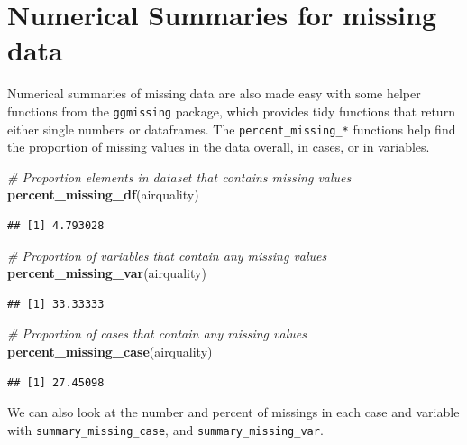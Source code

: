 \documentclass[]{article}
\newenvironment{Shaded}{\begin{snugshade}}{\end{snugshade}}
\newcommand{\KeywordTok}[1]{\textcolor[rgb]{0.13,0.29,0.53}{\textbf{{#1}}}}
\newcommand{\DecValTok}[1]{\textcolor[rgb]{0.00,0.00,0.81}{{#1}}}
\newcommand{\StringTok}[1]{\textcolor[rgb]{0.31,0.60,0.02}{{#1}}}
\newcommand{\CommentTok}[1]{\textcolor[rgb]{0.56,0.35,0.01}{\textit{{#1}}}}
\newcommand{\NormalTok}[1]{{#1}}
\begin{document}
\section{Numerical Summaries for missing
data}\label{numerical-summaries-for-missing-data}

Numerical summaries of missing data are also made easy with some helper
functions from the \texttt{ggmissing} package, which provides tidy
functions that return either single numbers or dataframes. The
\texttt{percent\_missing\_*} functions help find the proportion of
missing values in the data overall, in cases, or in variables.

\begin{Shaded}
\begin{Highlighting}[]
\CommentTok{# Proportion elements in dataset that contains missing values}
\KeywordTok{percent_missing_df}\NormalTok{(airquality)}
\end{Highlighting}
\end{Shaded}

\begin{verbatim}
## [1] 4.793028
\end{verbatim}

\begin{Shaded}
\begin{Highlighting}[]
\CommentTok{# Proportion of variables that contain any missing values}
\KeywordTok{percent_missing_var}\NormalTok{(airquality)}
\end{Highlighting}
\end{Shaded}

\begin{verbatim}
## [1] 33.33333
\end{verbatim}

\begin{Shaded}
\begin{Highlighting}[]
 \CommentTok{# Proportion of cases that contain any missing values}
\KeywordTok{percent_missing_case}\NormalTok{(airquality)}
\end{Highlighting}
\end{Shaded}

\begin{verbatim}
## [1] 27.45098
\end{verbatim}

We can also look at the number and percent of missings in each case and
variable with \texttt{summary\_missing\_case}, and
\texttt{summary\_missing\_var}.

\begin{Shaded}
\end{Shaded}
\end{document}
